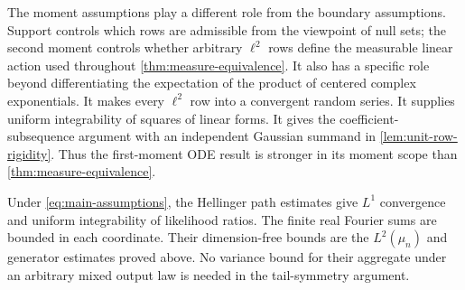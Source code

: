 The moment assumptions play a different role from the boundary assumptions.
Support controls which rows are admissible from the viewpoint of null sets;
the second moment controls whether arbitrary \(\ell^2\) rows define the
measurable linear action used throughout \cref{thm:measure-equivalence}.
It also has a specific role beyond differentiating the expectation of the
product of centered complex exponentials.
It makes every \(\ell^2\) row into a convergent random series.
It supplies uniform integrability of squares of linear forms.
It gives the coefficient-subsequence argument with an independent Gaussian
summand in \cref{lem:unit-row-rigidity}.
Thus the first-moment ODE result is stronger in its moment scope than
\cref{thm:measure-equivalence}.

Under \eqref{eq:main-assumptions}, the Hellinger path estimates give
\(L^1\) convergence and uniform integrability of likelihood ratios.
The finite real Fourier sums are bounded in each coordinate.
Their dimension-free bounds are the \(L^2(\mu_n)\) and generator estimates
proved above.
No variance bound for their aggregate under an arbitrary mixed output law is
needed in the tail-symmetry argument.
